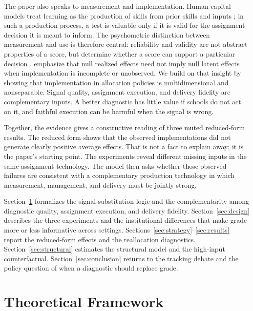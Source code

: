 \documentclass[11pt]{article}
\begin{document}
The paper also speaks to measurement and implementation. Human capital models treat learning as the production of skills from prior skills and inputs \citep{benporath1967,cunhaheckman2007}; in such a production process, a test is valuable only if it is valid for the assignment decision it is meant to inform. The psychometric distinction between measurement and use is therefore central: reliability and validity are not abstract properties of a score, but determine whether a score can support a particular decision \citep{lordnovick1968,cronbachmeehl1955}. \citet{angristmeager2023} emphasize that null realized effects need not imply null latent effects when implementation is incomplete or unobserved. We build on that insight by showing that implementation in allocation policies is multidimensional and nonseparable. Signal quality, assignment execution, and delivery fidelity are complementary inputs. A better diagnostic has little value if schools do not act on it, and faithful execution can be harmful when the signal is wrong.

Together, the evidence gives a constructive reading of three muted reduced-form results. The reduced form shows that the observed implementations did not generate clearly positive average effects. That is not a fact to explain away; it is the paper's starting point. The experiments reveal different missing inputs in the same assignment technology. The model then asks whether those observed failures are consistent with a complementary production technology in which measurement, management, and delivery must be jointly strong.

Section~\ref{sec:theory} formalizes the signal-substitution logic and the complementarity among diagnostic quality, assignment execution, and delivery fidelity. Section~\ref{sec:design} describes the three experiments and the institutional differences that make grade more or less informative across settings. Sections~\ref{sec:strategy}--\ref{sec:results} report the reduced-form effects and the reallocation diagnostics. Section~\ref{sec:structural} estimates the structural model and the high-input counterfactual. Section~\ref{sec:conclusion} returns to the tracking debate and the policy question of when a diagnostic should replace grade.

\section{Theoretical Framework}
\label{sec:theory}
\end{document}

